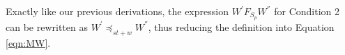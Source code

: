 \documentclass[journal,compsoc]{IEEEtran}
\begin{document}
 Exactly like our previous derivations, the expression $W^{'}  F_{S_p} W^{''}$ for Condition 2  can be rewritten as  $W^{'}  \preccurlyeq_{\mathit{st}+w} W^{''}$,  thus reducing the definition into Equation \ref{eqn:MW}. 
\end{document}
